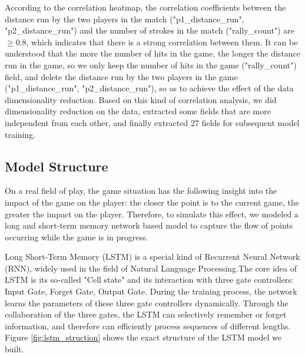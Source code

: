According to the correlation heatmap, the correlation coefficients between the distance run by the two players in the match ("p1\_distance\_run", "p2\_distance\_run") and the number of strokes in the match ("rally\_count") are $\geq 0.8$, which indicates that there is a strong correlation between them. It can be understood that the more the number of hits in the game, the longer the distance run in the game, so we only keep the number of hits in the game ("rally\_count") field, and delete the distance run by the two players in the game ("p1\_distance\_run", "p2\_distance\_run"), so as to achieve the effect of the data dimensionality reduction. Based on this kind of correlation analysis, we did dimensionality reduction on the data, extracted some fields that are more independent from each other, and finally extracted 27 fields for subsequent model training.




\subsection{Model Structure}\label{sec:model_structure}
On a real field of play, the game situation has the following insight into the impact of the game on the player: the closer the point is to the current game, the greater the impact on the player.\cite{insight} Therefore, to simulate this effect, we modeled a long and short-term memory network based model to capture the flow of points occurring while the game is in progress.


Long Short-Term Memory (LSTM) is a special kind of Recurrent Neural Network (RNN), widely used in the field of Natural Language Processing.The core idea of LSTM is its so-called "Cell state" and its interaction with three gate controllers: Input Gate, Forget Gate, Output Gate. During the training process, the network learns the parameters of these three gate controllers dynamically. Through the collaboration of the three gates, the LSTM can selectively remember or forget information, and therefore can efficiently process sequences of different lengths. Figure \ref{fig:lstm_struction} shows the exact structure of the LSTM model we built.

